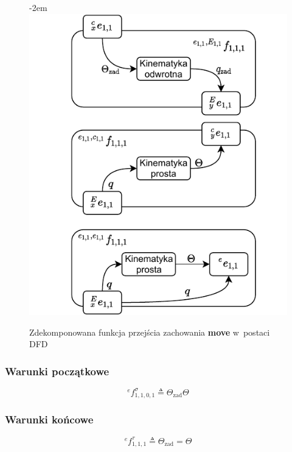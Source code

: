 \begin{figure}[ht]
    \leftskip-2em
    \includegraphics[width=1.1\columnwidth]{figures/ISR-ve-manip-fp-move.pdf}
    \caption{Zdekomponowana funkcja przejścia zachowania \textbf{move} w~postaci DFD}
    \label{fig:ve-manip-fp-move}
\end{figure}

\subsubsection{Warunki początkowe}
\begin{equation}
    {}^{e}f^{\sigma}_{1,1,0,1} \triangleq \Theta_{\mathrm{zad}} \Theta
\end{equation}

\subsubsection{Warunki końcowe}
\begin{equation}
    {}^{e}f^{\tau}_{1,1,1} \triangleq \Theta_{\mathrm{zad}} = \Theta
\end{equation}

